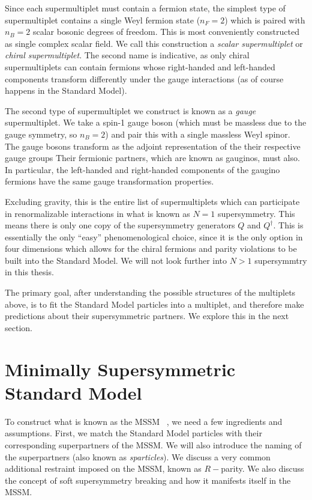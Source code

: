 Since each supermultiplet must contain a fermion state, the simplest type of supermultiplet contains a single Weyl fermion state ($n_F = 2$) which is paired with $n_B = 2$ scalar bosonic degrees of freedom.
This is most conveniently constructed as single complex scalar field.
We call this construction a \textit{scalar supermultiplet} or \textit{chiral supermultiplet}.
The second name is indicative, as only chiral supermultiplets can contain fermions whose right-handed and left-handed components transform differently under the gauge interactions (as of course happens in the Standard Model).

The second type of supermultiplet we construct is known as a \textit{gauge} supermultiplet.
We take a spin-1 gauge boson (which must be massless due to the gauge symmetry, so $n_B = 2$) and pair this with a single massless Weyl spinor\footnotemark.
The gauge bosons transform as the adjoint representation of the their respective gauge groups
Their fermionic partners, which are known as gauginos, must also.
In particular, the left-handed and right-handed components of the gaugino fermions have the same gauge transformation properties.

Excluding gravity, this is the entire list of supermultiplets which can participate in renormalizable interactions in what is known as $N=1$ supersymmetry.
This means there is only one copy of the supersymmetry generators $Q$ and $Q^\dagger$.
This is essentially the only ``easy'' phenomenological choice, since it is the only option in four dimensions which allows for the chiral fermions and parity violations to be built into the Standard Model.
We will not look further into $N>1$ supersymmtry in this thesis.

The primary goal, after understanding the possible structures of the multiplets above, is to fit the Standard Model particles into a multiplet, and therefore make predictions about their supersymmetric partners.
We explore this in the next section.

\section{Minimally Supersymmetric Standard Model}

To construct what is known as the MSSM ~\cite{Dimopoulos:1981zb,Dimopoulos:1981yj,Ibanez:1981yh,Marciano:1981un,susyPrimer}, we need a few ingredients and assumptions.
First, we match the Standard Model particles with their corresponding superpartners of the MSSM.
We will also introduce the naming of the superpartners (also known as \textit{sparticles}).
We discuss a very common additional restraint imposed on the MSSM, known as $R-$parity.
We also discuss the concept of soft supersymmetry breaking and how it manifests itself in the MSSM.

